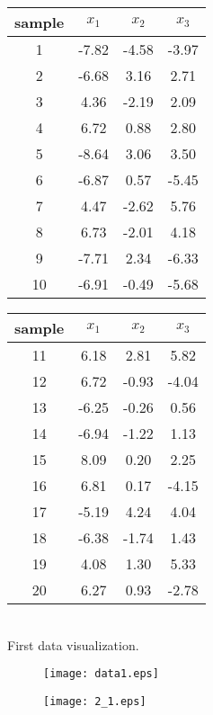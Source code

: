 \indent \indent \begin{tabular}{|c||c|c|c|}
  \hline
  sample & $x_1$ & $x_2$ & $x_3$ \\
  \hline
  1 & -7.82 & -4.58 & -3.97 \\
  \hline
  2 & -6.68 & 3.16 & 2.71 \\
  \hline
  3 & 4.36 & -2.19 & 2.09 \\
  \hline
  4 & 6.72 & 0.88 & 2.80 \\
  \hline
  5 & -8.64 & 3.06 & 3.50 \\
  \hline
  6 & -6.87 & 0.57 & -5.45 \\
  \hline
  7 & 4.47 & -2.62 & 5.76 \\
  \hline
  8 & 6.73 & -2.01 & 4.18 \\
  \hline
  9 & -7.71 & 2.34 & -6.33 \\
  \hline
  10 & -6.91 & -0.49 & -5.68 \\
  \hline
\end{tabular}\indent
\begin{tabular}{|c||c|c|c|}
  \hline
  sample & $x_1$ & $x_2$ & $x_3$ \\
  \hline
  11 & 6.18 & 2.81 & 5.82 \\
  \hline
  12 & 6.72 & -0.93 & -4.04 \\
  \hline
  13 & -6.25 & -0.26 & 0.56 \\
  \hline
  14 & -6.94 & -1.22 & 1.13 \\
  \hline
  15 & 8.09 & 0.20 & 2.25 \\
  \hline
  16 & 6.81 & 0.17 & -4.15 \\
  \hline
  17 & -5.19 & 4.24 & 4.04 \\
  \hline
  18 & -6.38 & -1.74 & 1.43 \\
  \hline
  19 & 4.08 & 1.30 & 5.33 \\
  \hline
  20 & 6.27 & 0.93 & -2.78 \\
  \hline
\end{tabular}
~\\

First data visualization.
\begin{figure}[!h]
\begin{minipage}
{0.5\linewidth}
\centering
\texttt{[image: data1.eps]}
\end{minipage}
%
\begin{minipage}
{0.5\linewidth}
\centering
\texttt{[image: 2\_1.eps]}
\end{minipage}
\end{figure}

